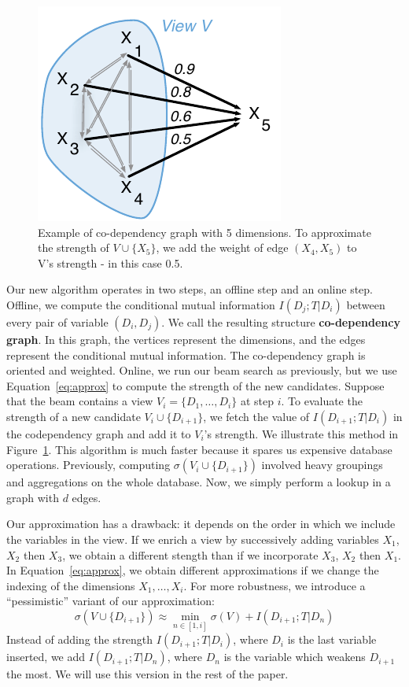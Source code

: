 \begin{figure}[t!]
\centering
\includegraphics[width=0.5\columnwidth]{images/codependency}
\caption{Example of co-dependency graph with 5 dimensions. To approximate the
strength of $V \cup \{X_5\}$, we add the weight of edge $(X_4, X_5)$ to V's
strength -  in this case 0.5.}
\label{pic:codependency}
\end{figure}
Our new algorithm operates in two steps, an offline step and an online step.
Offline, we compute the conditional mutual information  $ I(D_j ; T | D_i)$
between every pair of variable $(D_i, D_j)$. We call the resulting structure
\textbf{co-dependency graph}. In this graph, the vertices represent the
dimensions, and the edges represent the conditional mutual information. The
co-dependency graph is oriented and weighted.  Online, we run our beam search
as previously, but we use Equation~\ref{eq:approx} to compute the strength of
the new candidates.  Suppose that the beam contains a view $V_i= \{D_1, \ldots,
D_i\}$ at step $i$.  To evaluate the strength of a new candidate $V_i \cup
\{D_{i+1}\}$, we fetch the value of  $ I(D_{i+1} ; T | D_i)$ in the
codependency graph and add it to $V_i$'s strength. We illustrate this method in
Figure~\ref{pic:codependency}.  This algorithm is much faster because it spares
us expensive database operations. Previously, computing $\sigma(V_i \cup
\{D_{i+1}\})$ involved heavy groupings and aggregations on the whole database.
Now, we simply perform a lookup in a graph with $d$ edges.

Our approximation has a drawback: it depends on the order in which we include
the variables in the view. If we enrich a view by successively adding variables
$X_1$, $X_2$ then $X_3$, we obtain a different stength than if we incorporate
$X_3$, $X_2$ then $X_1$. In Equation~\ref{eq:approx}, we obtain different
approximations if we change the indexing of the dimensions $X_1, \ldots, X_i$.
For more robustness, we introduce a ``pessimistic'' variant of our
approximation:
\begin{equation}\label{eq:robustapprox}
    \sigma(V \cup \{D_{i+1}\}) 
    \approx \min_{n \in [1, i]} \sigma(V) + I(D_{i+1} ; T | D_{n})
\end{equation}
Instead of adding the strength $I(D_{i+1}; T | D_i)$, where $D_i$ is the last
variable inserted, we add $I(D_{i+1}; T | D_n)$, where $D_n$ is the variable
which weakens $D_{i+1}$ the most. We will use this version in the rest of the
paper.

